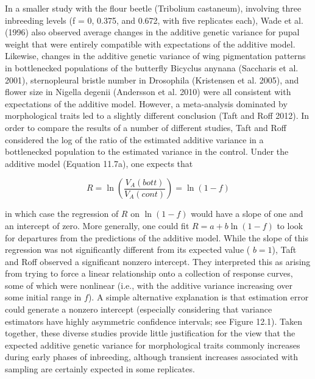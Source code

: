 \documentclass{article}
\begin{document}
In a smaller study with the flour beetle (Tribolium castaneum), involving three inbreeding levels (f = 0, 0.375, and 0.672, with five replicates each), Wade et al. (1996) also observed average changes in the additive genetic variance for pupal weight that were entirely compatible with expectations of the additive model. Likewise, changes in the additive genetic variance of wing pigmentation patterns in bottlenecked populations of the butterfly Bicyclus anynana (Saccharis et al. 2001), sternopleural bristle number in Drosophila (Kristensen et al. 2005), and flower size in Nigella degenii (Andersson et al. 2010) were all consistent with expectations of the additive model. However, a meta-analysis dominated by morphological traits led to a slightly different conclusion (Taft and Roff 2012). In order to compare the results of a number of different studies, Taft and Roff considered the log of the ratio of the estimated additive variance in a bottlenecked population to the estimated variance in the control. Under the additive model (Equation 11.7a), one expects that

\begin{equation}
R=\ln\left(\frac{V_{A}(bott)}{V_{A}(cont)}\right)=\ln(1-f)
\end{equation}

in which case the regression of  $ R $ on  $ \ln(1 - f) $ would have a slope of one and an intercept of zero. More generally, one could fit  $ R = a + b\ln(1 - f) $ to look for departures from the predictions of the additive model. While the slope of this regression was not significantly different from its expected value ( $ b = 1 $), Taft and Roff observed a significant nonzero intercept. They interpreted this as arising from trying to force a linear relationship onto a collection of response curves, some of which were nonlinear (i.e., with the additive variance increasing over some initial range in  $ f $). A simple alternative explanation is that estimation error could generate a nonzero intercept (especially considering that variance estimators have highly asymmetric confidence intervals; see Figure 12.1). Taken together, these diverse studies provide little justification for the view that the expected additive genetic variance for morphological traits commonly increases during early phases of inbreeding, although transient increases associated with sampling are certainly expected in some replicates.
\end{document}
